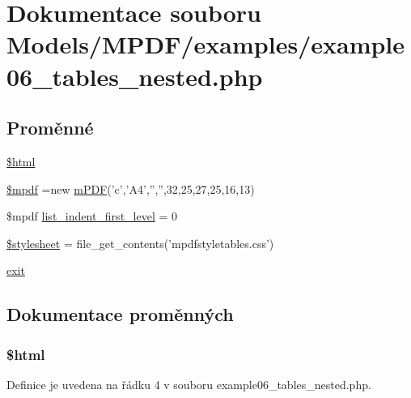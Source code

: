 \hypertarget{example06__tables__nested_8php}{\section{Dokumentace souboru Models/\-M\-P\-D\-F/examples/example06\-\_\-tables\-\_\-nested.php}
\label{example06__tables__nested_8php}
}
\subsection*{Proměnné}
\begin{DoxyCompactItemize}
\item 
\hyperlink{example06__tables__nested_8php_a6f96e7fc92441776c9d1cd3386663b40}{\$html}
\item 
\hyperlink{example06__tables__nested_8php_ad028f81910d6cbab9b184d2214b3a8f8}{\$mpdf} =new \hyperlink{classm_p_d_f}{m\-P\-D\-F}('c','A4','','',32,25,27,25,16,13)
\item 
\$mpdf \hyperlink{example06__tables__nested_8php_a8780612514d14375709d0685d189579e}{list\-\_\-indent\-\_\-first\-\_\-level} = 0
\item 
\hyperlink{example06__tables__nested_8php_a19e5cf73e817c55a49205e6ec78c88a8}{\$stylesheet} = file\-\_\-get\-\_\-contents('mpdfstyletables.\-css')
\item 
\hyperlink{example06__tables__nested_8php_a6733eb5f605d09eaede9845835d71c4e}{exit}
\end{DoxyCompactItemize}


\subsection{Dokumentace proměnných}
\hypertarget{example06__tables__nested_8php_a6f96e7fc92441776c9d1cd3386663b40}{
\subsubsection[{\$html}]{\setlength{\rightskip}{0pt plus 5cm}\$html}}\label{example06__tables__nested_8php_a6f96e7fc92441776c9d1cd3386663b40}


Definice je uvedena na řádku 4 v souboru example06\-\_\-tables\-\_\-nested.\-php.

